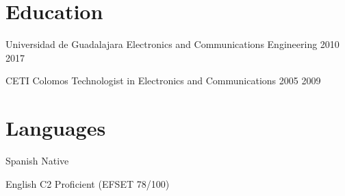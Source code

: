 \documentclass[10pt, letterpaper]{article} %
\begin{document}

\section{Education}

\eduitem
{Universidad de Guadalajara}
{Electronics and Communications Engineering}
{2010}
{2017}


\eduitem
{CETI Colomos}
{Technologist in Electronics and Communications}
{2005}
{2009}


\section{Languages}

\langitem
{Spanish}
{Native}

\langitem
{English}
{C2 Proficient (EFSET 78/100)}

\end{document}
